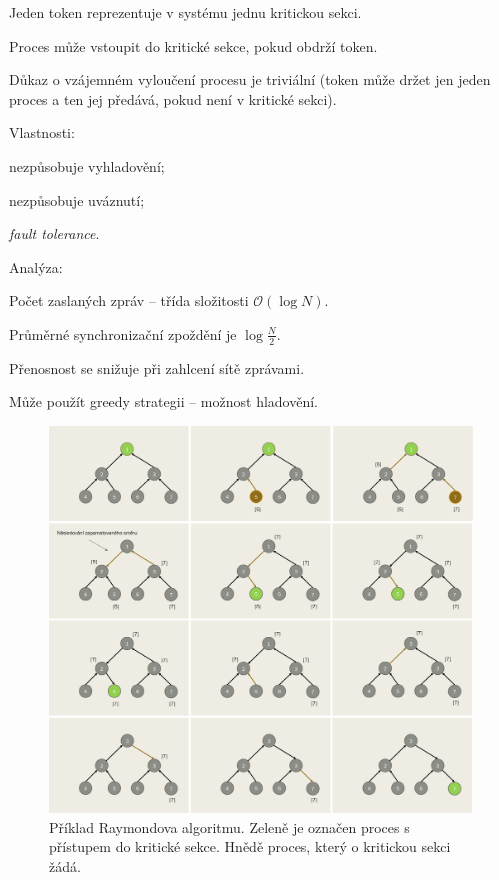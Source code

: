 \begin{compactitem}
    \item Jeden token reprezentuje v systému jednu kritickou sekci.
    \item Proces může vstoupit do kritické sekce, pokud obdrží token.
    \item Důkaz o vzájemném vyloučení procesu je triviální (token může držet jen jeden proces a ten jej předává, pokud není v kritické sekci).
    \item Vlastnosti: \begin{compactitem}
        \item nezpůsobuje vyhladovění;
        \item nezpůsobuje uváznutí;
        \item \textit{fault tolerance}.
    \end{compactitem}

    \item Analýza: \begin{compactitem}
        \item Počet zaslaných zpráv -- třída složitosti $\mathcal{O}(\log{N})$.
        \item Průměrné synchronizační zpoždění je $\log{\frac{N}{2}}$.
        \item Přenosnost se snižuje při zahlcení sítě zprávami.
        \item Může použít greedy strategii -- možnost hladovění.
    \end{compactitem}

    \begin{figure}[H]
        \centering
        \includegraphics[width=1\linewidth]{raymonduv_algoritmus.png}
        \caption{Příklad Raymondova algoritmu. Zeleně je označen proces s přístupem do kritické sekce. Hnědě proces, který o kritickou sekci žádá.}
    \end{figure}
\end{compactitem}

